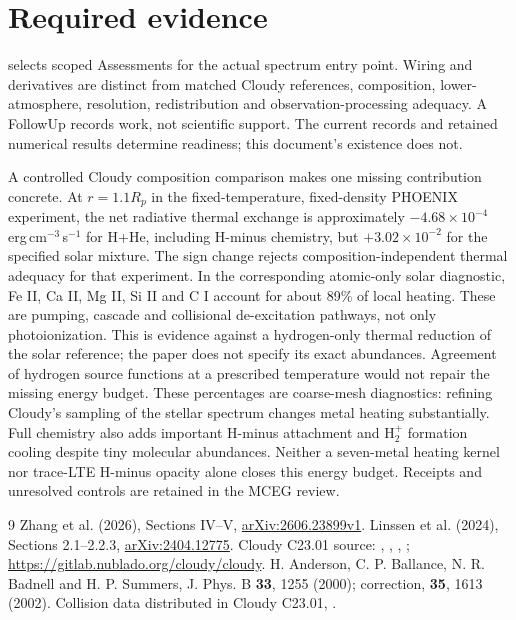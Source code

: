 \documentclass[10pt,a4paper]{article}
\begin{document}
\section{Required evidence}
 selects scoped Assessments for the
actual spectrum entry point. Wiring and derivatives are distinct from
matched Cloudy references, composition, lower-atmosphere, resolution,
redistribution and observation-processing adequacy. A FollowUp records work,
not scientific support. The current records and retained numerical results
determine readiness; this document's existence does not.

A controlled Cloudy composition comparison makes one missing contribution
concrete. At $r=1.1R_p$ in the fixed-temperature, fixed-density PHOENIX
experiment, the net radiative thermal exchange is approximately
$-4.68\times10^{-4}$ erg\,cm$^{-3}$\,s$^{-1}$ for H+He, including H-minus
chemistry, but $+3.02\times10^{-2}$ for the specified solar mixture. The sign
change rejects composition-independent thermal adequacy for that experiment.
In the corresponding atomic-only solar diagnostic, Fe II, Ca II, Mg II,
Si II and C I account for about 89\% of local heating. These are pumping,
cascade and collisional de-excitation pathways, not only photoionization.
This is evidence against a hydrogen-only thermal reduction of the solar
reference; the paper does not specify its exact abundances. Agreement of
hydrogen source functions at a prescribed temperature would not repair the
missing energy budget. These percentages are coarse-mesh diagnostics:
refining Cloudy's sampling of the stellar spectrum changes metal heating
substantially. Full chemistry also adds important H-minus attachment and
H$_2^+$ formation cooling despite tiny molecular abundances. Neither a
seven-metal heating kernel nor trace-LTE H-minus opacity alone closes this
energy budget. Receipts and unresolved controls are retained in the MCEG review.

\begin{thebibliography}{9}
 Zhang et al. (2026), Sections IV--V,
\href{https://arxiv.org/abs/2606.23899v1}{arXiv:2606.23899v1}.
 Linssen et al. (2024), Sections 2.1--2.2.3,
\href{https://arxiv.org/abs/2404.12775}{arXiv:2404.12775}.
 Cloudy C23.01 source:
, , ,
; \url{https://gitlab.nublado.org/cloudy/cloudy}.
 H. Anderson, C. P. Ballance, N. R. Badnell and H. P. Summers,
J. Phys. B \textbf{33}, 1255 (2000); correction, \textbf{35}, 1613 (2002).
Collision data distributed in Cloudy C23.01, .
\end{thebibliography}
\end{document}
